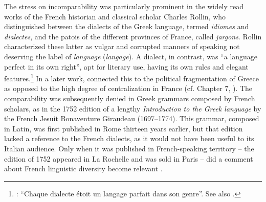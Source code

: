 The stress on incomparability was particularly prominent in the widely read works of the French historian and classical scholar Charles Rollin, who distinguished between the dialects of the Greek language, termed \textit{idiomes} and \textit{dialectes}, and the patois of the different provinces of France, called \textit{jargons}. Rollin characterized these latter as vulgar and corrupted manners of speaking not deserving the label of \textit{language} (\textit{langage}). A dialect, in contrast, was “a language perfect in its own right”, apt for literary use, having its own rules and elegant features.\footnote{\citet[117]{Rollin1726}: “Chaque dialecte étoit un langage parfait dans son genre”. See also \citet[395]{Rollin1731}.} In a later work, \citet[395]{Rollin1731} connected this to the political fragmentation of Greece as opposed to the high degree of centralization in France (cf. Chapter 7, ). The comparability was subsequently denied in Greek grammars composed by French scholars, as in the 1752 edition of a lengthy \textit{Introduction to the Greek language} by the French Jesuit Bonaventure Giraudeau (1697–1774). This grammar, composed in Latin, was first published in Rome thirteen years earlier, but that edition lacked a reference to the French dialects, as it would not have been useful to its Italian audience. Only when it was published in French-speaking territory – the edition of 1752 appeared in La Rochelle and was sold in Paris – did a comment about French linguistic diversity become relevant \citep[117]{Giraudeau1752}.

